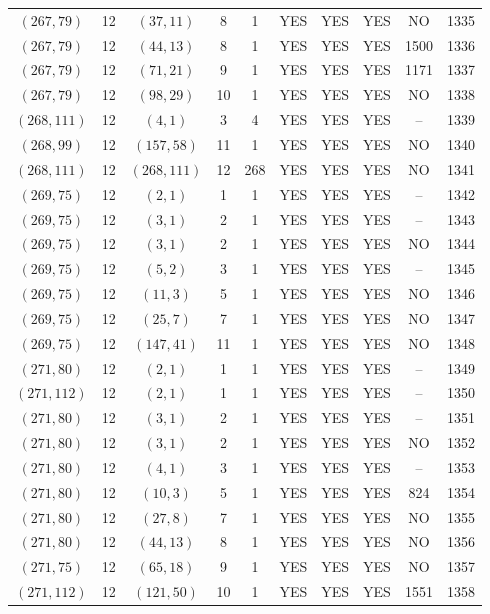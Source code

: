 \begin{longtable}{|c|c|c|c|c|c|c|c|c|c|}
$(267, 79)$ & 12 & $(37, 11)$ & 8 & 1 & YES & YES & YES & NO & 1335\\
$(267, 79)$ & 12 & $(44, 13)$ & 8 & 1 & YES & YES & YES & 1500 & 1336\\
$(267, 79)$ & 12 & $(71, 21)$ & 9 & 1 & YES & YES & YES & 1171 & 1337\\
$(267, 79)$ & 12 & $(98, 29)$ & 10 & 1 & YES & YES & YES & NO & 1338\\
$(268, 111)$ & 12 & $(4, 1)$ & 3 & 4 & YES & YES & YES & -- & 1339\\
$(268, 99)$ & 12 & $(157, 58)$ & 11 & 1 & YES & YES & YES & NO & 1340\\
$(268, 111)$ & 12 & $(268, 111)$ & 12 & 268 & YES & YES & YES & NO & 1341\\
$(269, 75)$ & 12 & $(2, 1)$ & 1 & 1 & YES & YES & YES & -- & 1342\\
$(269, 75)$ & 12 & $(3, 1)$ & 2 & 1 & YES & YES & YES & -- & 1343\\
$(269, 75)$ & 12 & $(3, 1)$ & 2 & 1 & YES & YES & YES & NO & 1344\\
$(269, 75)$ & 12 & $(5, 2)$ & 3 & 1 & YES & YES & YES & -- & 1345\\
$(269, 75)$ & 12 & $(11, 3)$ & 5 & 1 & YES & YES & YES & NO & 1346\\
$(269, 75)$ & 12 & $(25, 7)$ & 7 & 1 & YES & YES & YES & NO & 1347\\
$(269, 75)$ & 12 & $(147, 41)$ & 11 & 1 & YES & YES & YES & NO & 1348\\
$(271, 80)$ & 12 & $(2, 1)$ & 1 & 1 & YES & YES & YES & -- & 1349\\
$(271, 112)$ & 12 & $(2, 1)$ & 1 & 1 & YES & YES & YES & -- & 1350\\
$(271, 80)$ & 12 & $(3, 1)$ & 2 & 1 & YES & YES & YES & -- & 1351\\
$(271, 80)$ & 12 & $(3, 1)$ & 2 & 1 & YES & YES & YES & NO & 1352\\
$(271, 80)$ & 12 & $(4, 1)$ & 3 & 1 & YES & YES & YES & -- & 1353\\
$(271, 80)$ & 12 & $(10, 3)$ & 5 & 1 & YES & YES & YES & 824 & 1354\\
$(271, 80)$ & 12 & $(27, 8)$ & 7 & 1 & YES & YES & YES & NO & 1355\\
$(271, 80)$ & 12 & $(44, 13)$ & 8 & 1 & YES & YES & YES & NO & 1356\\
$(271, 75)$ & 12 & $(65, 18)$ & 9 & 1 & YES & YES & YES & NO & 1357\\
$(271, 112)$ & 12 & $(121, 50)$ & 10 & 1 & YES & YES & YES & 1551 & 1358\\

\end{longtable}
